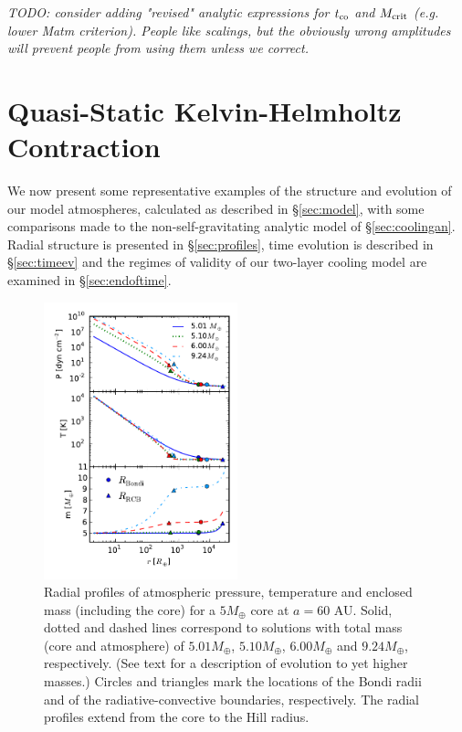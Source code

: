\documentclass[apj, numberedappendix]{emulateapj}
\newcommand{\MC}{M_{\rm crit}}
\begin{document}
\emph{TODO: consider adding "revised" analytic expressions for $t_{\rm co}$ and $\MC$ (e.g. lower Matm criterion).  People like scalings, but the obviously wrong amplitudes will prevent people from using them unless we correct.}


\section{Quasi-Static Kelvin-Helmholtz Contraction}
\label{sec:KH}

We now present some representative examples of the structure and evolution of our model atmospheres, calculated as described in \S\ref{sec:model}, with some comparisons made to the non-self-gravitating analytic model of \S\ref{sec:coolingan}.  Radial structure is presented in \S\ref{sec:profiles}, time evolution is described in \S\ref{sec:timeev} and the regimes of validity of our two-layer cooling model are examined in \S\ref{sec:endoftime}.

\begin{figure}[tb]
\centering
\includegraphics[width=0.5\textwidth]{../../figs/ModelAtmospheres/RadSelfGravPoly/PaperFigs/PTm_profiles_v2_smallM.pdf}
\caption{Radial profiles of atmospheric pressure, temperature and enclosed mass (including the core) for a $5 M_{\oplus}$ core at $a=60$ AU.   Solid, dotted and dashed lines correspond to solutions with total mass (core and atmosphere) of $5.01 M_{\oplus}$, $5.10 M_{\oplus}$, $6.00 M_{\oplus}$ and $9.24 M_{\oplus}$, respectively.  (See text for a description of evolution to yet higher masses.)   Circles and triangles mark the locations of the Bondi radii and of the radiative-convective boundaries, respectively.  The radial profiles extend from the core to the Hill radius.} 
\label{fig:profiles}
\end{figure}
\end{document}
